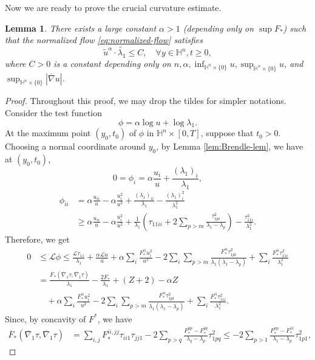 \documentclass[reqno]{amsart}
\newtheorem{lemma}[theorem]{Lemma}
\theoremstyle{remark}
\newcommand{\abs}[1]{\left\lvert{#1}\right\rvert}
\renewcommand{\H}{{\mathbb{H}}}
\newcommand{\bnabla}{\overline{\nabla}}
\theoremstyle{definition}
\numberwithin{equation}{section}
\begin{document}
Now we are ready to prove the crucial curvature estimate.
\begin{lemma}\label{lem:estimate-on-eigenvalues}
    There exists a large constant \(\alpha > 1\) (depending only on \(\sup F_*\)) such that the normalized flow \eqref{eq:normalized-flow} satisfies
    \[ \tilde{u}^\alpha \cdot \tilde{\lambda_1} \leq C, \quad  \forall y\in \H^n, t\geq 0, \]
    where \(C>0\) is a constant depending only on \(n,\alpha, \inf_{\H^n\times\{0\}}u, \sup_{\H^n\times\{0\}}u\), and \( \sup_{\H^n\times\{0\}}\abs{\bnabla u}\).
\end{lemma} 
\begin{proof} 
    Throughout this proof, we may drop the tildes for simpler notations. Consider the test function \[ \phi = \alpha \log u + \log \lambda_1. \] 
    At the maximum point \((y_0,t_0)\) of \(\phi\) in \(\H^n \times [0,T]\), suppose that \(t_0 > 0\). Choosing a normal coordinate around \(y_0\), by Lemma \ref{lem:Brendle-lem}, we have at \((y_0,t_0)\),
    \[ 0 = \phi_i = \alpha\frac{u_i}{u} + \frac{(\lambda_1)_i}{\lambda_1},  \]
    \[ \begin{aligned}
        \phi_{ii} &= \alpha\frac{u_{ii}}{u} - \alpha\frac{u_i^2}{u^2} + \frac{(\lambda_1)_{ii}}{\lambda_1} - \frac{(\lambda_1)_i^2}{\lambda_1^2} \\
        &\geq \alpha\frac{u_{ii}}{u} - \alpha\frac{u_i^2}{u^2} + \frac{1}{\lambda_1}\left( \tau_{11ii} + 2\sum_{p>m}\frac{\tau_{1pi}^2}{\lambda_1 - \lambda_p} \right) - \frac{\tau_{11i}^2}{\lambda_1^2}.
    \end{aligned} \]
    Therefore, we get 
    \[ \begin{aligned}
            0 &\leq \mathscr{L}\phi \leq \frac{\mathscr{L}\tau_{11}}{\lambda_1} + \frac{\alpha\mathscr{L}u}{u} + \alpha\sum_i \frac{F_*^{ii}u_i^2}{u^2} - 2\sum_i \sum_{p>m}\frac{F_*^{ii}\tau_{1pi}^2}{\lambda_1(\lambda_1 - \lambda_p)} + \sum_i \frac{F_*^{ii}\tau_{11i}^2}{\lambda_1^2} \\
            &= \frac{\ddot{F_*}(\bnabla_1 \tau, \bnabla_1 \tau)}{\lambda_1} - \frac{2F_*}{\lambda_1} + (Z+2) - \alpha Z  \\
            &\quad + \alpha \sum_i \frac{F_*^{ii}u_i^2}{u^2} - 2\sum_i\sum_{p>m}\frac{F_*^{ii}\tau_{1pi}^2}{\lambda_1(\lambda_1 - \lambda_p)} + \sum_i \frac{F_*^{ii}\tau_{11i}^2}{\lambda_1^2}. 
    \end{aligned} \]
    Since, by concavity of $F^*$, we have  
    \[ \begin{aligned}
        \ddot{F_*}(\bnabla_1 \tau, \bnabla_1 \tau) &= \sum_{i,j}{F_*^{ii,jj}\tau_{ii1}\tau_{jj1}} - 2\sum_{p>q}\frac{F_*^{pp} - F_*^{qq}}{\lambda_q - \lambda_p}\tau_{1pq}^2 \leq  - 2\sum_{p>1}\frac{F_*^{pp} - F_*^{11}}{\lambda_1 - \lambda_p}\tau_{1p1}^2 ,

\end{aligned}\]
\end{proof}
\end{document}
